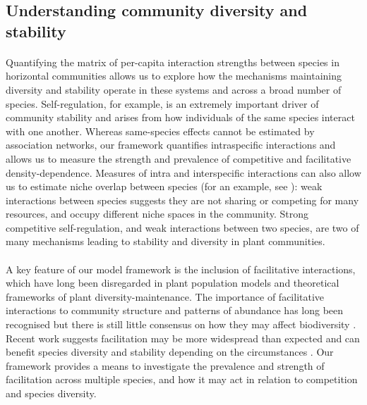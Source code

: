 \documentclass[a4,12pt]{article}
\begin{document}
    \subsection{Understanding community diversity and stability}

        \paragraph{}
        Quantifying the matrix of per-capita interaction strengths between species in horizontal communities allows us to explore how the mechanisms maintaining diversity and stability operate in these systems and across a broad number of species. Self-regulation, for example, is an extremely important driver of community stability \parencite{Barabas2017} and arises from how individuals of the same species interact with one another. Whereas same-species effects cannot be estimated by association networks, our framework quantifies intraspecific interactions and allows us to measure the strength and prevalence of competitive and facilitative density-dependence. Measures of intra and interspecific interactions can also allow us to estimate niche overlap between species (for an example, see \cite{Chu2015a}): weak interactions between species suggests they are not sharing or competing for many resources, and occupy different niche spaces in the community. Strong competitive self-regulation, and weak interactions between two species, are two of many mechanisms leading to stability and diversity in plant communities.

        \paragraph{}
        A key feature of our model framework is the inclusion of facilitative interactions, which have long been disregarded in plant population models and theoretical frameworks of plant diversity-maintenance. The importance of facilitative interactions to community structure and patterns of abundance has long been recognised \parencite{Callaway1997a} but there is still little consensus on how they may affect biodiversity \parencite{Bruno2003}. Recent work suggests facilitation may be more widespread than expected \parencite{Gross2015, Picoche2020} and can  benefit species diversity and stability depending on the circumstances \parencite{Coyte2015, Brooker2008}. Our framework provides a means to investigate the prevalence and strength of facilitation across multiple species, and how it may act in relation to competition and species diversity.  
        
\end{document}
